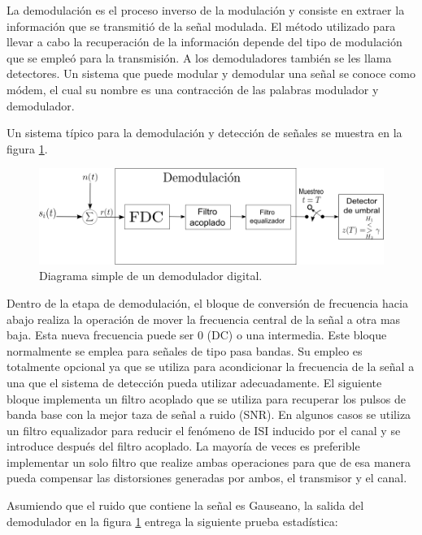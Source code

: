 La demodulaci\'on es el proceso inverso de la modulaci\'on y consiste en
extraer la informaci\'on que se transmiti\'o de la se\~nal modulada. El m\'etodo
utilizado para llevar a cabo la recuperaci\'on de la informaci\'on depende del
tipo de modulaci\'on que se emple\'o para la transmisi\'on. A los demoduladores
tambi\'en se les llama detectores. Un sistema que puede modular y demodular una
se\~nal se conoce como m\'odem, el cual su nombre es una contracci\'on de las
palabras modulador y demodulador. 

Un sistema t\'ipico para la demodulaci\'on y detecci\'on de se\~nales se muestra en la
figura \ref{fig:simpledemod}. 

\begin{figure}[tp]
\centering
	\includegraphics[scale=0.5]{figs/simpledemod}
	\vspace{0.3in}
	\caption{Diagrama simple de un demodulador digital.}
	\label{fig:simpledemod}
\end{figure}

Dentro de la etapa de demodulaci\'on, el bloque de conversi\'on de frecuencia hacia abajo
realiza la operaci\'on de mover la frecuencia central de la se\~nal a otra mas baja. Esta nueva
frecuencia puede ser 0 (DC) o una intermedia. Este bloque normalmente se emplea para se\~nales de
tipo pasa bandas. Su empleo es totalmente opcional ya que se utiliza para acondicionar la frecuencia
de la se\~nal a una que el sistema de detecci\'on pueda utilizar adecuadamente. El siguiente bloque
implementa un filtro acoplado que se utiliza para recuperar los pulsos de banda base con la mejor
taza de se\~nal a ruido (SNR). En algunos casos se utiliza un filtro equalizador para reducir el
fen\'omeno de ISI inducido por el canal y se introduce despu\'es del filtro acoplado. La mayor\'ia de
veces es preferible implementar un solo filtro que realize ambas operaciones para que de esa manera
pueda compensar las distorsiones generadas por ambos, el transmisor y el canal.

Asumiendo que el ruido que contiene la se\~nal es Gauseano, la salida del demodulador en la figura
\ref{fig:simpledemod} entrega la siguiente prueba estad\'istica:

